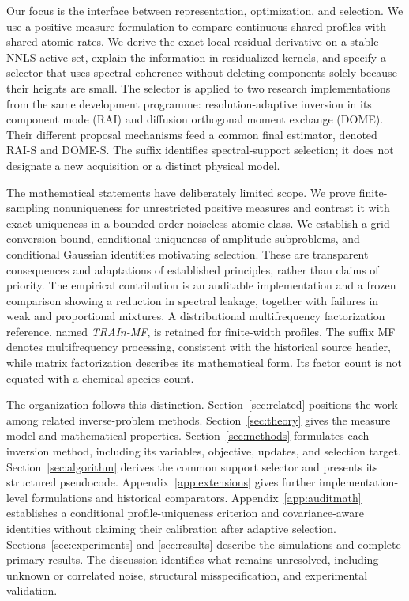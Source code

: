 Our focus is the interface between representation, optimization, and selection. We use a positive-measure formulation to compare continuous shared profiles with shared atomic rates. We derive the exact local residual derivative on a stable NNLS active set, explain the information in residualized kernels, and specify a selector that uses spectral coherence without deleting components solely because their heights are small. The selector is applied to two research implementations from the same development programme: resolution-adaptive inversion in its component mode (RAI) and diffusion orthogonal moment exchange (DOME). Their different proposal mechanisms feed a common final estimator, denoted RAI-S and DOME-S. The suffix identifies spectral-support selection; it does not designate a new acquisition or a distinct physical model.

The mathematical statements have deliberately limited scope. We prove finite-sampling nonuniqueness for unrestricted positive measures and contrast it with exact uniqueness in a bounded-order noiseless atomic class. We establish a grid-conversion bound, conditional uniqueness of amplitude subproblems, and conditional Gaussian identities motivating selection. These are transparent consequences and adaptations of established principles, rather than claims of priority. The empirical contribution is an auditable implementation and a frozen comparison showing a reduction in spectral leakage, together with failures in weak and proportional mixtures. A distributional multifrequency factorization reference, named \emph{TRAIn-MF}, is retained for finite-width profiles. The suffix MF denotes multifrequency processing, consistent with the historical source header, while matrix factorization describes its mathematical form. Its factor count is not equated with a chemical species count.

The organization follows this distinction. Section~\ref{sec:related} positions the work among related inverse-problem methods. Section~\ref{sec:theory} gives the measure model and mathematical properties. Section~\ref{sec:methods} formulates each inversion method, including its variables, objective, updates, and selection target. Section~\ref{sec:algorithm} derives the common support selector and presents its structured pseudocode. Appendix~\ref{app:extensions} gives further implementation-level formulations and historical comparators. Appendix~\ref{app:auditmath} establishes a conditional profile-uniqueness criterion and covariance-aware identities without claiming their calibration after adaptive selection. Sections~\ref{sec:experiments} and \ref{sec:results} describe the simulations and complete primary results. The discussion identifies what remains unresolved, including unknown or correlated noise, structural misspecification, and experimental validation.
